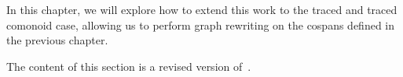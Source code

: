 In this chapter, we will explore how to extend this work to the traced and
traced comonoid case, allowing us to perform graph rewriting on the cospans
defined in the previous chapter.

\begin{remark}
    The content of this section is a revised version
    of~\cite[Sec. 5]{ghica2023rewriting}.
\end{remark}




